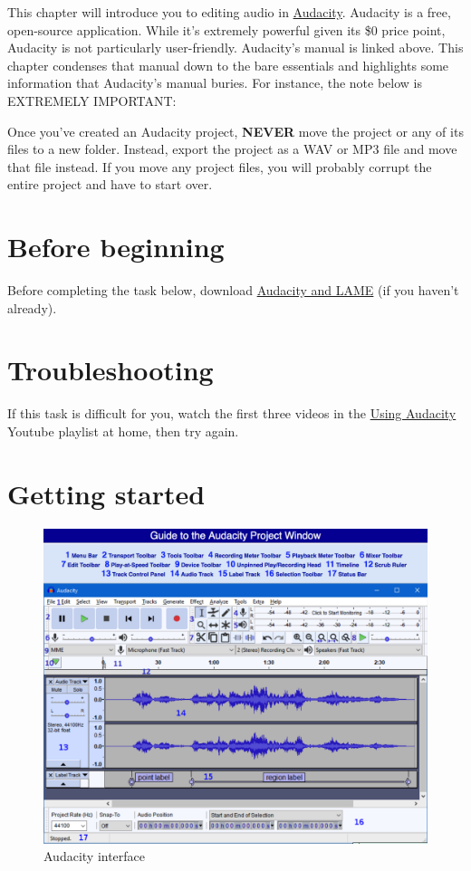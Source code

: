 \documentclass[]{book}
\theoremstyle{definition}
\theoremstyle{definition}
\theoremstyle{definition}
\theoremstyle{remark}
\begin{document}
This chapter will introduce you to editing audio in
\href{https://manual.audacityteam.org/}{Audacity}. Audacity is a free,
open-source application. While it's extremely powerful given its \$0
price point, Audacity is not particularly user-friendly. Audacity's
manual is linked above. This chapter condenses that manual down to the
bare essentials and highlights some information that Audacity's manual
buries. For instance, the note below is EXTREMELY IMPORTANT:

Once you've created an Audacity project, \textbf{NEVER} move the project
or any of its files to a new folder. Instead, export the project as a
WAV or MP3 file and move that file instead. If you move any project
files, you will probably corrupt the entire project and have to start
over.

\hypertarget{before-beginning}{%
\section{Before beginning}\label{before-beginning}}

Before completing the task below, download
\href{https://canvas.vt.edu/courses/73626/assignments/486486}{Audacity
and LAME} (if you haven't already).

\hypertarget{troubleshooting}{%
\section{Troubleshooting}\label{troubleshooting}}

If this task is difficult for you, watch the first three videos in the
\href{https://www.youtube.com/playlist?list=PLy3KiJOHvdl1epxRuzEQqjQu1V9szwqnl}{Using
Audacity} Youtube playlist at home, then try again.

\hypertarget{getting-started}{%
\section{Getting started}\label{getting-started}}

\begin{figure}
\centering
\includegraphics{audacity-interface.png}
\caption{Audacity interface}
\end{figure}
\end{document}
